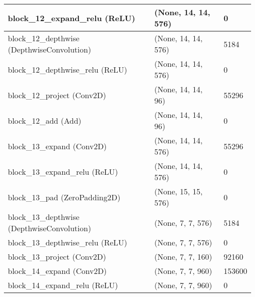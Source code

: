 \documentclass{article}
\begin{document}
\begin{center}
\begin{longtable}[h]{ p{}  p{}  p{}}
block\_12\_expand\_relu (ReLU)                     & (None, 14, 14, 576)  & 0        \\ \hline
block\_12\_depthwise (DepthwiseConvolution)        & (None, 14, 14, 576)  & 5184     \\ \hline
block\_12\_depthwise\_relu (ReLU)                  & (None, 14, 14, 576)  & 0        \\ \hline
block\_12\_project (Conv2D)                        & (None, 14, 14, 96)   & 55296    \\ \hline
block\_12\_add (Add)                               & (None, 14, 14, 96)   & 0        \\ \hline
block\_13\_expand (Conv2D)                         & (None, 14, 14, 576)  & 55296    \\ \hline
block\_13\_expand\_relu (ReLU)                     & (None, 14, 14, 576)  & 0        \\ \hline
block\_13\_pad (ZeroPadding2D)                     & (None, 15, 15, 576)  & 0        \\ \hline
block\_13\_depthwise (DepthwiseConvolution)        & (None, 7, 7, 576)    & 5184     \\ \hline
block\_13\_depthwise\_relu (ReLU)                  & (None, 7, 7, 576)    & 0        \\ \hline
block\_13\_project (Conv2D)                        & (None, 7, 7, 160)    & 92160    \\ \hline
block\_14\_expand (Conv2D)                         & (None, 7, 7, 960)    & 153600   \\ \hline
block\_14\_expand\_relu (ReLU)                     & (None, 7, 7, 960)    & 0        \\ \hline

\end{longtable}
\end{center}
\end{document}
